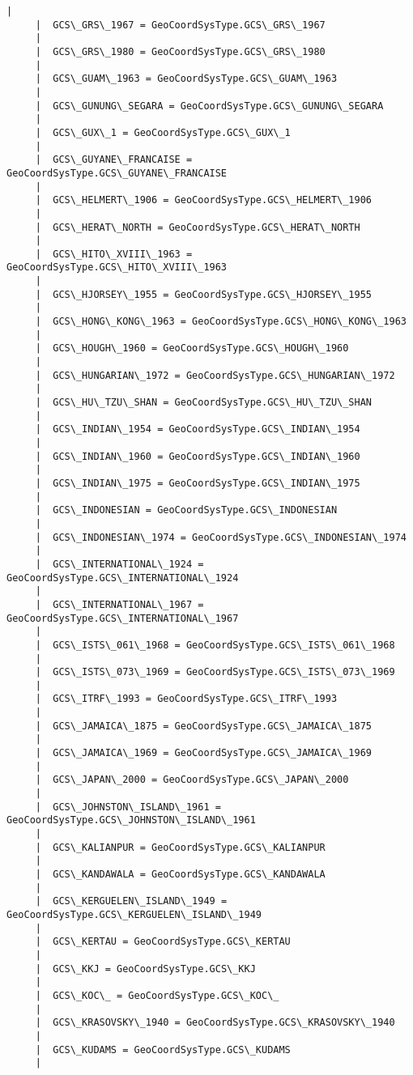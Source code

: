 \documentclass[11pt]{article}
\begin{document}
\begin{Verbatim}[commandchars=\\\{\}]
     |  
     |  GCS\_GRS\_1967 = GeoCoordSysType.GCS\_GRS\_1967
     |  
     |  GCS\_GRS\_1980 = GeoCoordSysType.GCS\_GRS\_1980
     |  
     |  GCS\_GUAM\_1963 = GeoCoordSysType.GCS\_GUAM\_1963
     |  
     |  GCS\_GUNUNG\_SEGARA = GeoCoordSysType.GCS\_GUNUNG\_SEGARA
     |  
     |  GCS\_GUX\_1 = GeoCoordSysType.GCS\_GUX\_1
     |  
     |  GCS\_GUYANE\_FRANCAISE = GeoCoordSysType.GCS\_GUYANE\_FRANCAISE
     |  
     |  GCS\_HELMERT\_1906 = GeoCoordSysType.GCS\_HELMERT\_1906
     |  
     |  GCS\_HERAT\_NORTH = GeoCoordSysType.GCS\_HERAT\_NORTH
     |  
     |  GCS\_HITO\_XVIII\_1963 = GeoCoordSysType.GCS\_HITO\_XVIII\_1963
     |  
     |  GCS\_HJORSEY\_1955 = GeoCoordSysType.GCS\_HJORSEY\_1955
     |  
     |  GCS\_HONG\_KONG\_1963 = GeoCoordSysType.GCS\_HONG\_KONG\_1963
     |  
     |  GCS\_HOUGH\_1960 = GeoCoordSysType.GCS\_HOUGH\_1960
     |  
     |  GCS\_HUNGARIAN\_1972 = GeoCoordSysType.GCS\_HUNGARIAN\_1972
     |  
     |  GCS\_HU\_TZU\_SHAN = GeoCoordSysType.GCS\_HU\_TZU\_SHAN
     |  
     |  GCS\_INDIAN\_1954 = GeoCoordSysType.GCS\_INDIAN\_1954
     |  
     |  GCS\_INDIAN\_1960 = GeoCoordSysType.GCS\_INDIAN\_1960
     |  
     |  GCS\_INDIAN\_1975 = GeoCoordSysType.GCS\_INDIAN\_1975
     |  
     |  GCS\_INDONESIAN = GeoCoordSysType.GCS\_INDONESIAN
     |  
     |  GCS\_INDONESIAN\_1974 = GeoCoordSysType.GCS\_INDONESIAN\_1974
     |  
     |  GCS\_INTERNATIONAL\_1924 = GeoCoordSysType.GCS\_INTERNATIONAL\_1924
     |  
     |  GCS\_INTERNATIONAL\_1967 = GeoCoordSysType.GCS\_INTERNATIONAL\_1967
     |  
     |  GCS\_ISTS\_061\_1968 = GeoCoordSysType.GCS\_ISTS\_061\_1968
     |  
     |  GCS\_ISTS\_073\_1969 = GeoCoordSysType.GCS\_ISTS\_073\_1969
     |  
     |  GCS\_ITRF\_1993 = GeoCoordSysType.GCS\_ITRF\_1993
     |  
     |  GCS\_JAMAICA\_1875 = GeoCoordSysType.GCS\_JAMAICA\_1875
     |  
     |  GCS\_JAMAICA\_1969 = GeoCoordSysType.GCS\_JAMAICA\_1969
     |  
     |  GCS\_JAPAN\_2000 = GeoCoordSysType.GCS\_JAPAN\_2000
     |  
     |  GCS\_JOHNSTON\_ISLAND\_1961 = GeoCoordSysType.GCS\_JOHNSTON\_ISLAND\_1961
     |  
     |  GCS\_KALIANPUR = GeoCoordSysType.GCS\_KALIANPUR
     |  
     |  GCS\_KANDAWALA = GeoCoordSysType.GCS\_KANDAWALA
     |  
     |  GCS\_KERGUELEN\_ISLAND\_1949 = GeoCoordSysType.GCS\_KERGUELEN\_ISLAND\_1949
     |  
     |  GCS\_KERTAU = GeoCoordSysType.GCS\_KERTAU
     |  
     |  GCS\_KKJ = GeoCoordSysType.GCS\_KKJ
     |  
     |  GCS\_KOC\_ = GeoCoordSysType.GCS\_KOC\_
     |  
     |  GCS\_KRASOVSKY\_1940 = GeoCoordSysType.GCS\_KRASOVSKY\_1940
     |  
     |  GCS\_KUDAMS = GeoCoordSysType.GCS\_KUDAMS
     |  

\end{Verbatim}
\end{document}
